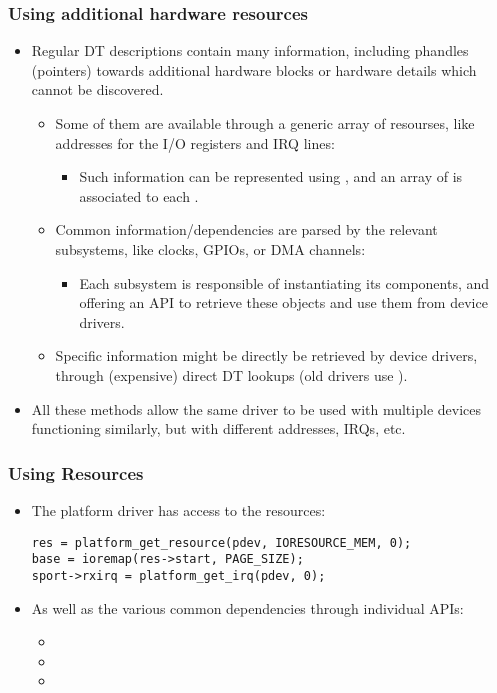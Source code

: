 \begin{frame}
  \frametitle{Using additional hardware resources}
  \begin{itemize}
  \item Regular DT descriptions contain many information, including
    phandles (pointers) towards additional hardware blocks or hardware
    details which cannot be discovered.
    \begin{itemize}
    \item Some of them are available through a generic array of resourses,
      like addresses for the I/O registers and IRQ lines:
      \begin{itemize}
      \item Such information can be represented using ,
        and an array of  is associated to each
        .
      \end{itemize}
    \item Common information/dependencies are parsed by the relevant
      subsystems, like clocks, GPIOs, or DMA channels:
      \begin{itemize}
      \item Each subsystem is responsible of instantiating its
        components, and offering an API to retrieve these objects and
        use them from device drivers.
      \end{itemize}
    \item Specific information might be directly be retrieved by
      device drivers, through (expensive) direct DT lookups (old drivers
      use ).
    \end{itemize}
  \item All these methods allow the same driver to be used with
    multiple devices functioning similarly, but with different
    addresses, IRQs, etc.
  \end{itemize}
\end{frame}

\begin{frame}[fragile]
  \frametitle{Using Resources}
  \begin{itemize}
  \item The platform driver has access to the resources:
    \begin{block}{}
  \begin{verbatim}
res = platform_get_resource(pdev, IORESOURCE_MEM, 0);
base = ioremap(res->start, PAGE_SIZE);
sport->rxirq = platform_get_irq(pdev, 0);
  \end{verbatim}
  \end{block}
  \item As well as the various common dependencies through individual
    APIs:
    \begin{itemize}
    \item {}
    \item {}
    \item {}
    \end{itemize}
  \end{itemize}
\end{frame}

